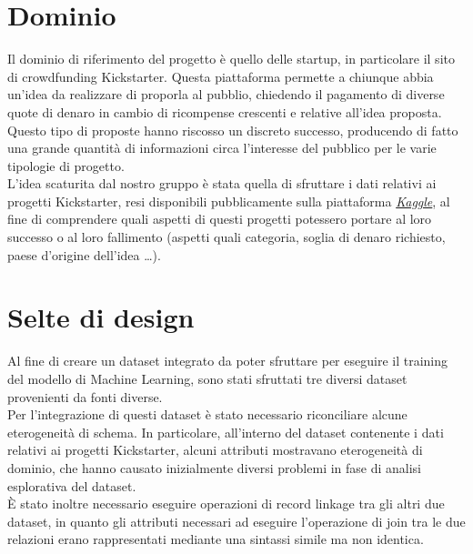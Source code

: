 \section{Dominio}
Il dominio di riferimento del progetto è quello delle startup, in particolare il sito di crowdfunding Kickstarter. Questa piattaforma permette a chiunque abbia un'idea da realizzare di proporla al pubblio, chiedendo il pagamento di diverse quote di denaro in cambio di ricompense crescenti e relative all'idea proposta.\\
Questo tipo di proposte hanno riscosso un discreto successo, producendo di fatto una grande quantità di informazioni circa l'interesse del pubblico per le varie tipologie di progetto.\\
L'idea scaturita dal nostro gruppo è stata quella di sfruttare i dati relativi ai progetti Kickstarter, resi disponibili pubblicamente sulla piattaforma \href{https://www.kaggle.com/}{\emph{Kaggle}}, al fine di comprendere quali aspetti di questi progetti potessero portare al loro successo o al loro fallimento (aspetti quali categoria, soglia di denaro richiesto, paese d'origine dell'idea \dots).

\section{Selte di design}
\label{sec:design}
Al fine di creare un dataset integrato da poter sfruttare per eseguire il training del modello di Machine Learning, sono stati sfruttati tre diversi dataset provenienti da fonti diverse.\\
Per l'integrazione di questi dataset è stato necessario riconciliare alcune eterogeneità di schema. In particolare, all'interno del dataset contenente i dati relativi ai progetti Kickstarter, alcuni attributi mostravano eterogeneità di dominio, che hanno causato inizialmente diversi problemi in fase di analisi esplorativa del dataset.\\
È stato inoltre necessario eseguire operazioni di record linkage tra gli altri due dataset, in quanto gli attributi necessari ad eseguire l'operazione di join tra le due relazioni erano rappresentati mediante una sintassi simile ma non identica.